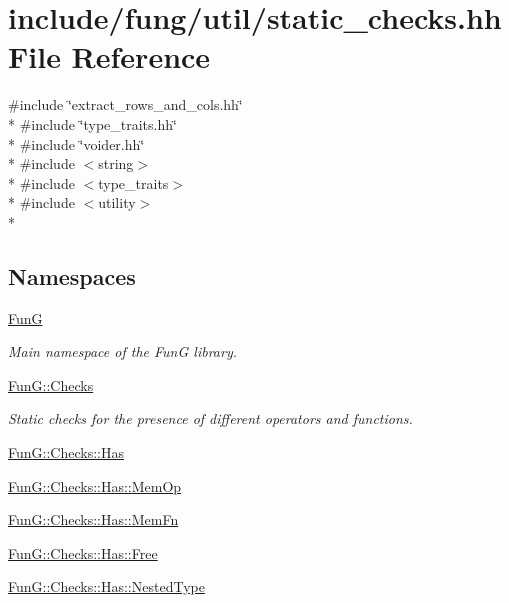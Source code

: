 \hypertarget{static__checks_8hh}{}\section{include/fung/util/static\+\_\+checks.hh File Reference}
\label{static__checks_8hh}
{\ttfamily \#include \char`\"{}extract\+\_\+rows\+\_\+and\+\_\+cols.\+hh\char`\"{}}\\*
{\ttfamily \#include \char`\"{}type\+\_\+traits.\+hh\char`\"{}}\\*
{\ttfamily \#include \char`\"{}voider.\+hh\char`\"{}}\\*
{\ttfamily \#include $<$string$>$}\\*
{\ttfamily \#include $<$type\+\_\+traits$>$}\\*
{\ttfamily \#include $<$utility$>$}\\*
\subsection*{Namespaces}
\begin{DoxyCompactItemize}
\item 
 \hyperlink{namespaceFunG}{FunG}
\begin{DoxyCompactList}\small\item\em Main namespace of the FunG library. \end{DoxyCompactList}\item 
 \hyperlink{namespaceFunG_1_1Checks}{Fun\+G\+::\+Checks}
\begin{DoxyCompactList}\small\item\em Static checks for the presence of different operators and functions. \end{DoxyCompactList}\item 
 \hyperlink{namespaceFunG_1_1Checks_1_1Has}{Fun\+G\+::\+Checks\+::\+Has}
\item 
 \hyperlink{namespaceFunG_1_1Checks_1_1Has_1_1MemOp}{Fun\+G\+::\+Checks\+::\+Has\+::\+Mem\+Op}
\item 
 \hyperlink{namespaceFunG_1_1Checks_1_1Has_1_1MemFn}{Fun\+G\+::\+Checks\+::\+Has\+::\+Mem\+Fn}
\item 
 \hyperlink{namespaceFunG_1_1Checks_1_1Has_1_1Free}{Fun\+G\+::\+Checks\+::\+Has\+::\+Free}
\item 
 \hyperlink{namespaceFunG_1_1Checks_1_1Has_1_1NestedType}{Fun\+G\+::\+Checks\+::\+Has\+::\+Nested\+Type}
\end{DoxyCompactItemize}
